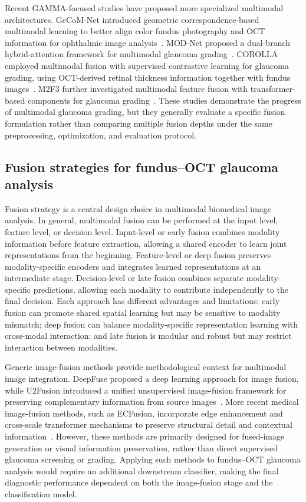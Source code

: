 \documentclass[preprint,12pt]{elsarticle}
\begin{document}
Recent GAMMA-focused studies have proposed more specialized multimodal architectures. GeCoM-Net introduced geometric correspondence-based multimodal learning to better align color fundus photography and OCT information for ophthalmic image analysis~\cite{wang2024geometric}. MOD-Net proposed a dual-branch hybrid-attention framework for multimodal glaucoma grading~\cite{wang2025dual}. COROLLA employed multimodal fusion with supervised contrastive learning for glaucoma grading, using OCT-derived retinal thickness information together with fundus images~\cite{cai2022corolla}. M2F3 further investigated multimodal feature fusion with transformer-based components for glaucoma grading~\cite{zhao2025enhancing}. These studies demonstrate the progress of multimodal glaucoma grading, but they generally evaluate a specific fusion formulation rather than comparing multiple fusion depths under the same preprocessing, optimization, and evaluation protocol.

\subsection{Fusion strategies for fundus--OCT glaucoma analysis}
\label{subsec:fusion_strategies}

Fusion strategy is a central design choice in multimodal biomedical image analysis. In general, multimodal fusion can be performed at the input level, feature level, or decision level. Input-level or early fusion combines modality information before feature extraction, allowing a shared encoder to learn joint representations from the beginning. Feature-level or deep fusion preserves modality-specific encoders and integrates learned representations at an intermediate stage. Decision-level or late fusion combines separate modality-specific predictions, allowing each modality to contribute independently to the final decision. Each approach has different advantages and limitations: early fusion can promote shared spatial learning but may be sensitive to modality mismatch; deep fusion can balance modality-specific representation learning with cross-modal interaction; and late fusion is modular and robust but may restrict interaction between modalities.

Generic image-fusion methods provide methodological context for multimodal image integration. DeepFuse proposed a deep learning approach for image fusion, while U2Fusion introduced a unified unsupervised image-fusion framework for preserving complementary information from source images~\cite{ram2017deepfuse,xu2020u2fusion}. More recent medical image-fusion methods, such as ECFusion, incorporate edge enhancement and cross-scale transformer mechanisms to preserve structural detail and contextual information~\cite{luo2025novel}. However, these methods are primarily designed for fused-image generation or visual information preservation, rather than direct supervised glaucoma screening or grading. Applying such methods to fundus--OCT glaucoma analysis would require an additional downstream classifier, making the final diagnostic performance dependent on both the image-fusion stage and the classification model.
\end{document}
